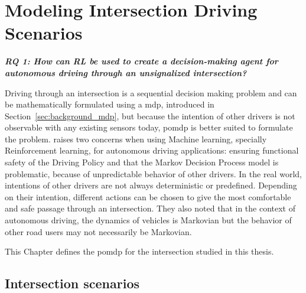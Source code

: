 \chapter{Modeling Intersection Driving Scenarios}
\label{ch:modeling_intersection}
\begin{center}
  \textit{\textbf{RQ 1: How can RL be used to create a decision-making agent for autonomous driving through an unsignalized intersection?}}
  \end{center}
  \vspace{12pt}
  
Driving through an intersection is a sequential decision making problem and can be mathematically formulated using a \gls{mdp}, introduced in Section~\ref{sec:background_mdp}, but because the intention of other drivers is not observable with any existing sensors today, \gls{pomdp} is better suited to formulate the problem. 
 raises two concerns when using Machine learning, specially Reinforcement learning, for autonomous driving applications: ensuring functional safety of the Driving Policy and that the Markov Decision Process model is problematic, because of unpredictable behavior of other drivers.
In the real world, intentions of other drivers are not always deterministic or predefined. Depending on their intention, different actions can be chosen to give the most comfortable and safe passage through an intersection.
They also noted that in the context of autonomous driving, the dynamics of vehicles is Markovian but the behavior of other road users may not necessarily be Markovian.

This Chapter defines the \gls{pomdp} for the intersection studied in this thesis. 

\section{Intersection scenarios}


	
	
